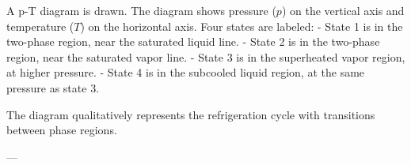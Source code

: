 A p-T diagram is drawn. The diagram shows pressure (\( p \)) on the vertical axis and temperature (\( T \)) on the horizontal axis. Four states are labeled:  
- State 1 is in the two-phase region, near the saturated liquid line.  
- State 2 is in the two-phase region, near the saturated vapor line.  
- State 3 is in the superheated vapor region, at higher pressure.  
- State 4 is in the subcooled liquid region, at the same pressure as state 3.  

The diagram qualitatively represents the refrigeration cycle with transitions between phase regions.

---